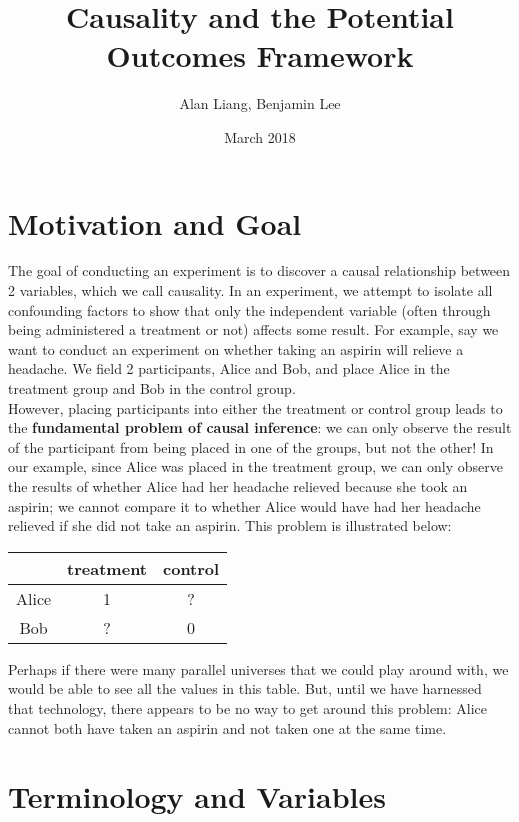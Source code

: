 \documentclass{article}
\title{Causality and the Potential Outcomes Framework}
\author{Alan Liang, Benjamin Lee}
\date{March 2018}
\begin{document}
\maketitle

\section{Motivation and Goal}
The goal of conducting an experiment is to discover a causal relationship between 2 variables, which we call causality.
In an experiment, we attempt to isolate all confounding factors to show that only the independent variable (often through being administered a treatment or not) affects some result.
For example, say we want to conduct an experiment on whether taking an aspirin will relieve a headache.
We field 2 participants, Alice and Bob, and place Alice in the treatment group and Bob in the control group.
\\
However, placing participants into either the treatment or control group leads to the \textbf{fundamental problem of causal inference}: we can only observe the result of the participant from being placed in one of the groups, but not the other!
In our example, since Alice was placed in the treatment group, we can only observe the results of whether Alice had her headache relieved because she took an aspirin; we cannot compare it to whether Alice would have had her headache relieved if she did not take an aspirin.
This problem is illustrated below:

\begin{center}
    \begin{tabular}{|c|c|c|}
        \hline
         & treatment & control \\
        \hline
        Alice & 1 & ? \\
        \hline
        Bob & ? & 0 \\
        \hline
    \end{tabular}
\end{center}

Perhaps if there were many parallel universes that we could play around with, we would be able to see all the values in this table.
But, until we have harnessed that technology, there appears to be no way to get around this problem: Alice cannot both have taken an aspirin and not taken one at the same time.
\section{Terminology and Variables}
\end{document}
